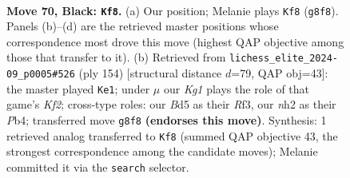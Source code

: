 \documentclass[11pt]{article}
\begin{document}
\begin{figure}[p]\centering
\begin{subfigure}{0.46\textwidth}\centering
\resizebox{\linewidth}{!}{%
\newchessgame
\chessboard[
  setfen={6k1/6p1/p2b2rr/Pppb1p1p/2p2P1P/2B1P1P1/1P2K2N/2R3R1 b - - 13 70},
  showmover=false,
  pgfstyle=straightmove, color=movearrow, markmove={g8-f8}
]}
\caption{}
\end{subfigure}\hfill
\begin{subfigure}{0.46\textwidth}\centering
\resizebox{\linewidth}{!}{%
\newchessgame
\chessboard[
  setfen={2r4r/2kb1p2/4p1p1/1p1pP2p/pP3P2/P1P2RP1/4BK1P/3R4 w - - 95 78},
  showmover=false,
  pgfstyle=straightmove, color=movearrow, markmove={f2-e1}
]}
\caption{}
\end{subfigure}
\\[4pt]

\caption{\textbf{Move 70, Black: \texttt{Kf8}.} (a) Our position; Melanie plays \texttt{Kf8} (\texttt{g8f8}). Panels (b)--(d) are the retrieved master positions whose correspondence most drove this move (highest QAP objective among those that transfer to it). (b) Retrieved from \texttt{lichess\_elite\_2024-09\_p0005\#526} (ply 154) [structural distance $d$=79, QAP obj=43]: the master played \texttt{Ke1}; under $\mu$ our \emph{Kg1} plays the role of that game's \emph{Kf2}; cross-type roles: our \emph{B}d5 as their \emph{R}f3, our \emph{n}h2 as their \emph{P}b4; transferred move \texttt{g8f8} \textbf{(endorses this move)}. Synthesis: 1 retrieved analog transferred to \texttt{Kf8} (summed QAP objective 43, the strongest correspondence among the candidate moves); Melanie committed it via the \texttt{search} selector.}
\label{fig:thought-m139}
\end{figure}

\clearpage
\end{document}
